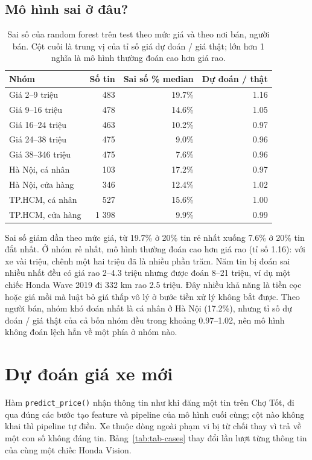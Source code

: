 \subsection{Mô hình sai ở đâu?}

\begin{table}[H]\centering
\caption{Sai số của random forest trên test theo mức giá và theo nơi bán, người bán. Cột cuối là trung vị của tỉ số giá
dự đoán / giá thật; lớn hơn 1 nghĩa là mô hình thường đoán cao hơn giá rao.}\label{tab:tab-err}
\begin{tabular}{lrrr}
\toprule
Nhóm & Số tin & Sai số \% median & Dự đoán / thật \\
\midrule
Giá 2--9 triệu & 483 & 19.7\% & 1.16 \\
Giá 9--16 triệu & 478 & 14.6\% & 1.05 \\
Giá 16--24 triệu & 463 & 10.2\% & 0.97 \\
Giá 24--38 triệu & 475 & 9.0\% & 0.96 \\
Giá 38--346 triệu & 475 & 7.6\% & 0.96 \\
\midrule
Hà Nội, cá nhân & 103 & 17.2\% & 0.97 \\
Hà Nội, cửa hàng & 346 & 12.4\% & 1.02 \\
TP.HCM, cá nhân & 527 & 15.6\% & 1.00 \\
TP.HCM, cửa hàng & 1 398 & 9.9\% & 0.99 \\
\bottomrule
\end{tabular}
\end{table}

Sai số giảm dần theo mức giá, từ 19.7\% ở 20\% tin rẻ nhất xuống 7.6\% ở 20\% tin đắt nhất. Ở nhóm rẻ nhất, mô hình
thường đoán cao hơn giá rao (tỉ số 1.16): với xe vài triệu, chênh một hai triệu đã là nhiều phần trăm. Năm tin bị đoán sai
nhiều nhất đều có giá rao 2--4.3 triệu nhưng được đoán 8--21 triệu, ví dụ một chiếc Honda Wave 2019 đi 332 km rao 2.5
triệu. Đây nhiều khả năng là tiền cọc hoặc giá mồi mà luật bỏ giá thấp vô lý ở bước tiền xử lý không bắt được. Theo người bán, nhóm khó đoán nhất là cá nhân ở Hà Nội (17.2\%), nhưng tỉ số dự đoán / giá thật của cả bốn nhóm đều
trong khoảng 0.97--1.02, nên mô hình không đoán lệch hẳn về một phía ở nhóm nào.

\section{Dự đoán giá xe mới}

Hàm \texttt{predict\_price()} nhận thông tin như khi đăng một tin trên Chợ Tốt, đi qua đúng các bước tạo feature và
pipeline của mô hình cuối cùng; cột nào không khai thì pipeline tự điền. Xe thuộc dòng ngoài phạm vi bị từ chối thay vì
trả về một con số không đáng tin. Bảng~\ref{tab:tab-cases} thay đổi lần lượt từng thông tin của cùng một chiếc Honda
Vision.

